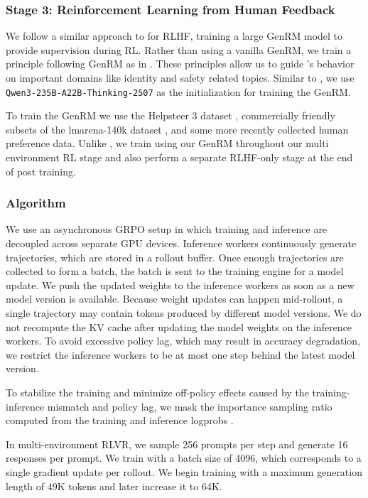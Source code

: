 \subsubsection{Stage 3: Reinforcement Learning from Human Feedback}
\label{subsec:RLHF}
We follow a similar approach to \nanomodel for RLHF, training a large GenRM model to provide supervision during RL. Rather than using a vanilla GenRM, we train a principle following GenRM as in \citet{wang2025rlbff}. These principles allow us to guide \ourmodel's behavior on important domains like identity and safety related topics. Similar to \nanomodel, we use \texttt{Qwen3-235B-A22B-Thinking-2507} as the initialization for training the GenRM. 

To train the GenRM we use the Helpsteer 3 dataset \citep{Wang2025HelpSteer3Preference}, commercially friendly subsets of the lmarena-140k dataset \citep{chiang2024chatbot}, and some more recently collected human preference data. Unlike \nanomodel, we train using our GenRM throughout our multi environment RL stage and also perform a separate RLHF-only stage at the end of post training.


\subsubsection{Algorithm}
We use an asynchronous GRPO setup in which training and inference are decoupled across separate GPU devices. Inference workers continuously generate trajectories, which are stored in a rollout buffer. Once enough trajectories are collected to form a batch, the batch is sent to the training engine for a model update. We push the updated weights to the inference workers as soon as a new model version is available. Because weight updates can happen mid-rollout, a single trajectory may contain tokens produced by different model versions. We do not recompute the KV cache after updating the model weights on the inference workers. To avoid excessive policy lag, which may result in accuracy degradation, we restrict the inference workers to be at most one step behind the latest model version.

To stabilize the training and minimize off-policy effects caused by the training-inference mismatch and policy lag, we mask the importance sampling ratio computed from the training and inference logprobs \citep{Shao2024DeepSeekMath, team2025every, yao2025offpolicy}.

In multi-environment RLVR, we sample 256 prompts per step and generate 16 responses per prompt. We train with a batch size of 4096, which corresponds to a single gradient update per rollout. We begin training with a maximum generation length of 49K tokens and later increase it to 64K.

